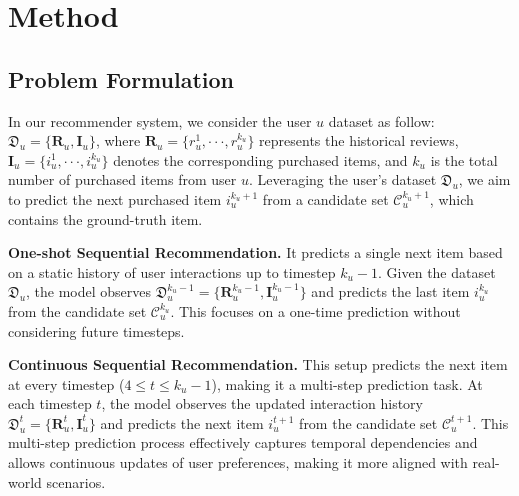 \section{Method}
\subsection{Problem Formulation}

In our recommender system, we consider the user $u$ dataset as follow: $\mathfrak{D}_u = \{\mathbf{R}_u, \mathbf{I}_u \}$, where $\mathbf{R}_u = \{r_u^1, \cdot\cdot\cdot, r_u^{k_u}\}$ represents the historical reviews, $\mathbf{I}_u = \{i_u^1, \cdot\cdot\cdot, i_u^{k_u} \}$ denotes the corresponding purchased items, and $k_u$ is the total number of purchased items from user $u$. 
Leveraging the user's dataset $\mathfrak{D}_u$, we aim to predict the next purchased item $i_u^{k_u+1}$ from a candidate set $\mathcal{C}_u^{k_u+1}$, which contains the ground-truth item. 

\smallskip
\noindent \textbf{One-shot Sequential Recommendation.} It predicts a single next item based on a static history of user interactions up to timestep $k_u-1$. Given the dataset $\mathfrak{D}_u$, the model observes $\mathfrak{D}_u^{k_u-1} = \{\mathbf{R}_u^{k_u-1}, \mathbf{I}_u^{k_u-1}\}$ and predicts the last item $i_u^{k_u}$ from the candidate set $\mathcal{C}_u^{k_u}$. This focuses on a one-time prediction without considering future timesteps.

\smallskip
\noindent \textbf{Continuous Sequential Recommendation.} This setup predicts the next item at every timestep ($4 \le t \le k_u-1$), making it a multi-step prediction task. At each timestep $t$, the model observes the updated interaction history $\mathfrak{D}_u^t = \{\mathbf{R}_u^t, \mathbf{I}_u^t\}$ and predicts the next item $i_u^{t+1}$ from the candidate set $\mathcal{C}_u^{t+1}$. This multi-step prediction process effectively captures temporal dependencies and allows continuous updates of user preferences, making it more aligned with real-world scenarios.



